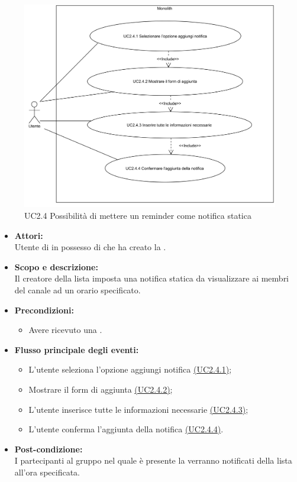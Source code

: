 \begin{figure}[H]
	\centering
	\includegraphics[width=15cm]{../../documenti/AnalisiDeiRequisiti/Diagrammi_img/uc2_4.png}
	\caption{UC2.4 Possibilità di mettere un reminder come notifica statica}
\end{figure}

\begin{itemize}
	\item \textbf{Attori:}
	\\Utente di  in possesso di \ProjectName{} che ha creato la .
	\item \textbf{Scopo e descrizione:} 
	\\Il creatore della lista imposta una notifica statica da visualizzare ai membri del canale ad un orario specificato.
	\item \textbf{Precondizioni:}
	\begin{itemize}
		\item Avere ricevuto una  .
	\end{itemize}
	\item \textbf{Flusso principale degli eventi:}
	\begin{itemize}
		\item L'utente seleziona l'opzione aggiungi notifica \hyperref[UC2.4.1]{(UC2.4.1)};
		\item Mostrare il form di aggiunta \hyperref[UC2.4.2]{(UC2.4.2)};
		\item L'utente inserisce tutte le informazioni necessarie \hyperref[UC2.4.3]{(UC2.4.3)};
		\item L'utente conferma l'aggiunta della notifica \hyperref[UC2.4.4]{(UC2.4.4)}.
	\end{itemize}
	\item \textbf{Post-condizione:}
	\\I partecipanti al gruppo nel quale è presente la  verranno notificati della lista all'ora specificata.
\end{itemize}

